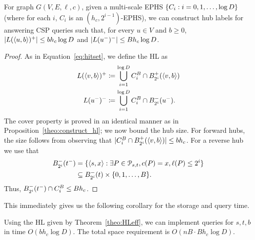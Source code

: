 \begin{theorem}
\label{theo:HLeff}
For graph $G(V,E,\ell,c)$, given a multi-scale EPHS $\crl*{C_i:i=0,1,\ldots,\log D}$ (where for each $i$, $C_i$ is an $(h_c,2^{i-1})$-EPHS), we can construct hub labels for answering CSP queries such that, for every $u\in V$ and $b\geq 0$, $\card{L(\pp{u,b})^+}\leq bh_c\log D$ and $\card{L(u^-)^-}\leq Bh_c\log D$. 
\end{theorem}
\begin{proof}
As in Equation~\eqref{eq:hitset}, we define the HL as
\begin{align*}
L(\pp{v,b})^+ &\defeq \bigcup_{i=1}^{\log D} C_i^B\cap \Bf_{2^i}(\pp{v,b})\\
L(u^-)^-  &\defeq \bigcup_{i=1}^{\log D} C_i^B\cap \Bb_{2^i}(u^-).
\end{align*}
The cover property is proved in an identical manner as in Proposition~\ref{theo:construct_hl}; we now bound the hub size.
For forward hubs, the size follows from observing that $ \card{C_i^B\cap \Bf_{2^i}(\pp{v,b})}\leq bh_c$.
For a reverse hub we use that
\begin{align*}
\Bb_{2^i}(t^-) &= \{\pp{s,x}: \exists P\in \Pst, c(P)=x, \ell(P)\leq 2^i\}\\
&\subseteq \Bb_{2^i}(t)\times \{0,1,\ldots,B\}.
\end{align*}
Thus, $\Bb_{2^i}(t^-)\cap C_i^B\leq Bh_c$.
\end{proof}

This immediately gives us the following corollary for the storage and query time.
\begin{corollary}
Using the HL given by Theorem~\ref{theo:HLeff}, we can implement queries for $s,t,b$ in time $O(b h_c\log D)$.
The total space requirement is $O(nB \cdot Bh_c\log D)$.
\end{corollary}



